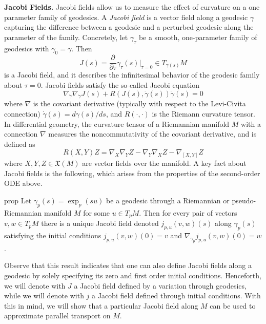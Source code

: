 \documentclass[11pt]{article}
\newcommand{\man}{M}
\begin{document}
\noindent \textbf{Jacobi Fields.} Jacobi fields allow us to measure the effect of curvature on a one parameter family of geodesics. A \textit{Jacobi field} is a vector field along a geodesic $\gamma$ capturing the difference between a geodesic and a perturbed geodesic along the parameter of the family. Concretely, let $\gamma_{\tau}$ be a smooth, one-parameter family of geodesics with $\gamma_0 = \gamma$. Then
\begin{equation}
    J(s) = \frac{\partial}{\partial \tau}\gamma_{\tau}(s)\bigg|_{\tau = 0} \in T_{\gamma(s)}\man
\end{equation}
is a Jacobi field, and it describes the infinitesimal behavior of the geodesic family about $\tau = 0$. Jacobi fields satisfy the so-called Jacobi equation
\begin{equation}
    \nabla_{\dot\gamma}\nabla_{\dot\gamma}J(s) + R(J(s), \dot{\gamma}(s))\dot{\gamma}(s) = 0
\end{equation}
where $\nabla$ is the covariant derivative (typically with respect to the Levi-Civita connection) $\dot{\gamma}(s) = d\gamma(s)/ds$, and $R(\cdot, \cdot)$ is the Riemann curvature tensor. In differential geometry, the curvature tensor of a Riemannian manifold $\man$ with a connection $\nabla$ measures the noncommutativity of the covariant derivative, and is defined as
\begin{equation*}
    R(X,Y)Z = \nabla_X \nabla_YZ - \nabla_Y\nabla_XZ - \nabla_{[X,Y]}Z
\end{equation*}
where $X,Y, Z \in \mathfrak{X}(\man)$ are vector fields over the manifold. A key fact about Jacobi fields is the following, which arises from the properties of the second-order ODE above. 

\begin{restatable}{prop}{}
Let $\gamma_p(s) = \exp_p(su)$ be a geodesic through a Riemannian or pseudo-Riemannian manifold $\man$ for some $u \in T_p\man$. Then for every pair of vectors $v, w \in T_p\man$ there is a unique Jacobi field denoted $j_{p, u}(v, w )(s)$ along $\gamma_p(s)$ satisfying the initial conditions $j_{p, u}(v, w )(0) = v$ and $\nabla_{\dot \gamma_p}j_{p, u}(v, w)(0) = w$. 
\end{restatable}

Observe that this result indicates that one can also define Jacobi fields along a geodesic by solely specifying its zero and first order initial conditions. Henceforth, we will denote with $J$ a Jacobi field defined by a variation through geodesics, while we will denote with $j$ a Jacobi field defined through initial conditions. With this in mind, we will show that a particular Jacobi field along $\man$ can be used to approximate parallel transport on $\man$.
\end{document}
